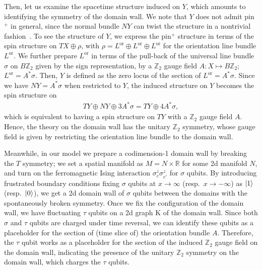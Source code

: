 \documentclass[12pt]{article}
\numberwithin{equation}{section}
\begin{document}
Then, let us examine the spacetime structure induced on $Y$, which amounts to identifying the symmetry of the domain wall. We note that $Y$ does not admit pin$^+$ in general, since the normal bundle $NY$ can twist the structure in a nontrivial fashion~\cite{Kapustin:2014dxa}. 
To see the structure of $Y$, we express the pin$^+$ structure in terms of the spin structure on $TX\oplus\rho$, with $\rho=L^{\mathrm{or}}\oplus L^{\mathrm{or}}\oplus L^{\mathrm{or}}$ for the orientation line bundle $L^{\mathrm{or}}$. 
We further prepare $L^{\mathrm{or}}$ in terms of the pull-back of the universal line bundle $\sigma$ on $B\mathbb{Z}_2$ given by the sign representation, by a $\mathbb{Z}_2$ gauge field $A: X\mapsto B\mathbb{Z}_2$; $L^{\mathrm{or}}=A^*\sigma$. 
Then, $Y$ is defined as the zero locus of the section of $L^{\mathrm{or}}=A^*\sigma$.
Since we have $NY=A^*\sigma$ when restricted to $Y$, the induced structure on $Y$ becomes the spin structure on
\begin{align}
    TY\oplus NY\oplus 3A^*\sigma = TY\oplus 4A^*\sigma,
    \label{eq:Ystructure}
\end{align}
which is equivalent to having a spin structure on $TY$ with a $\mathbb{Z}_2$ gauge field $A$. Hence, the theory on the domain wall has the unitary $\mathbb{Z}_2$ symmetry, whose gauge field is given by restricting the orientation line bundle to the domain wall.

Meanwhile, in our model we prepare a codimension-1 domain wall by breaking the $T$ symmetry; we set a spatial manifold as $M=N\times\mathbb{R}$ for some 2d manifold $N$, and turn on the ferromagnetic Ising interaction $\sigma^z_c\sigma^z_{c'}$ for $\sigma$ qubits. 
By introducing frustrated boundary conditions fixing $\sigma$ qubits at $x\to\infty$ (resp.~$x\to-\infty$) as $\ket{1}$ (resp.~$\ket{0}$), we get a 2d domain wall of $\sigma$ qubits between the domains with the spontaneously broken symmetry. Once we fix the configuration of the domain wall, we have fluctuating $\tau$ qubits on a 2d graph $\mathrm{K}$ of the domain wall. 
Since both $\sigma$ and $\tau$ qubits are charged under time reversal, we can identify these qubits as a placeholder for the section of (time slice of) the orientation bundle $A$. Therefore, the $\tau$ qubit works as a placeholder for the section of the induced $\mathbb{Z}_2$ gauge field on the domain wall, indicating the presence of the unitary $\mathbb{Z}_2$ symmetry on the domain wall, which charges the $\tau$ qubits. 
\end{document}
